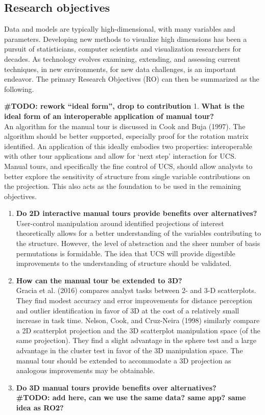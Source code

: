 \documentclass[
  11,
]{article}
\begin{document}
\hypertarget{research-objectives}{%
\subsection{Research objectives}\label{research-objectives}}

Data and models are typically high-dimensional, with many variables and parameters. Developing new methods to visualize high dimensions has been a pursuit of statisticians, computer scientists and visualization researchers for decades. As technology evolves examining, extending, and assessing current techniques, in new environments, for new data challenges, is an important endeavor. The primary Research Objectives (RO) can then be summarized as the following.

\textbf{\#TODO: rework ``ideal form'', drop to contribution}
1. \textbf{What is the ideal form of an interoperable application of manual tour?}\\
An algorithm for the manual tour is discussed in Cook and Buja (1997). The algorithm should be better supported, especially proof for the rotation matrix identified. An application of this ideally embodies two properties: interoperable with other tour applications and allow for `next step' interaction for UCS. Manual tours, and specifically the fine control of UCS, should allow analysts to better explore the sensitivity of structure from single variable contributions on the projection. This also acts as the foundation to be used in the remaining objectives.

\begin{enumerate}
\def\labelenumi{\arabic{enumi}.}
\setcounter{enumi}{1}
\item
  \textbf{Do 2D interactive manual tours provide benefits over alternatives?}\\
  User-control manipulation around identified projections of interest theoretically allows for a better understanding of the variables contributing to the structure. However, the level of abstraction and the sheer number of basis permutations is formidable. The idea that UCS will provide digestible improvements to the understanding of structure should be validated.
\item
  \textbf{How can the manual tour be extended to 3D?}\\
  Gracia et al. (2016) compares analyst tasks between 2- and 3-D scatterplots. They find modest accuracy and error improvements for distance perception and outlier identification in favor of 3D at the cost of a relatively small increase in task time. Nelson, Cook, and Cruz-Neira (1998) similarly compare a 2D scatterplot projection and the 3D scatterplot manipulation space (of the same projection). They find a slight advantage in the sphere test and a large advantage in the cluster test in favor of the 3D manipulation space. The manual tour should be extended to accommodate a 3D projection as analogous improvements may be obtainable.
\item
  \textbf{Do 3D manual tours provide benefits over alternatives?}\\
  \textbf{\#TODO: add here, can we use the same data? same app? same idea as RO2?}
\end{enumerate}
\end{document}
